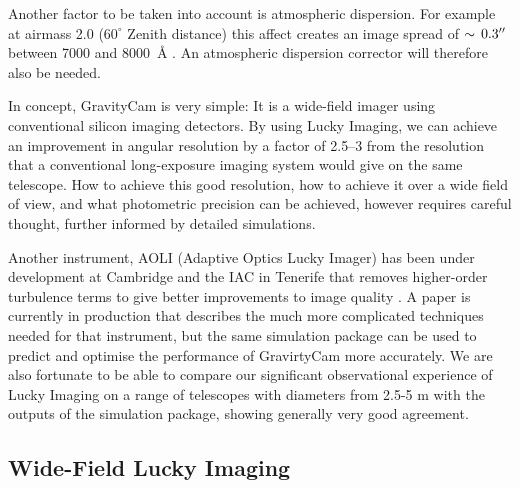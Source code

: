 \documentclass{pasa}%
\newcommand\arcsec{\hbox{$^{\prime\prime}$}}
\begin{document}
Another factor to be taken into account is atmospheric dispersion. For example at airmass 2.0 ($60^\circ$ Zenith distance) this affect creates an image spread of $\sim\,0.3\arcsec$
between 7000 and 8000~\AA{} \citep{Fillipenko1982}. An atmospheric dispersion corrector \citep{WW86} will therefore also be needed.

In concept, GravityCam is very simple: It is a wide-field imager using conventional silicon imaging detectors. By using Lucky Imaging, we can achieve an improvement in angular resolution by a factor of 2.5--3 from
the resolution that a conventional long-exposure imaging system would give on the same telescope. How to achieve this good resolution, how to achieve it over a wide field of view, and what photometric precision can be achieved, however requires careful thought, further informed by detailed simulations. 

Another instrument, AOLI (Adaptive Optics Lucky Imager) has been under development at Cambridge and the IAC in Tenerife that removes higher-order turbulence terms to give better improvements to image quality 
\citep{AOLI}. A paper is currently in production that describes the much more complicated techniques needed for that instrument, but the same simulation package can be used to predict and optimise the performance  
of \mbox{GravirtyCam} more accurately. We are also fortunate to be able to compare our significant observational experience of Lucky Imaging on a range of telescopes with diameters from 2.5-5 m with the outputs of
the simulation package, showing generally very good agreement.


\subsection{Wide-Field Lucky Imaging}
\end{document}
